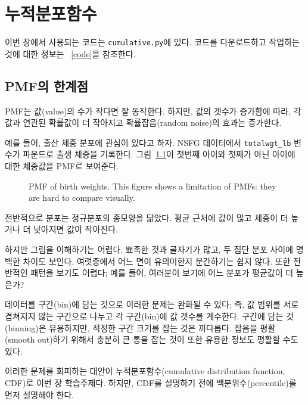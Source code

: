 
\chapter{누적분포함수}
\label{cumulative}

이번 장에서 사용되는 코드는 {\tt cumulative.py}에 있다.
코드를 다운로드하고 작업하는 것에 대한 정보는 ~\ref{code}을 참조한다.


\section{PMF의 한계점}

PMF는 값(value)의 수가 작다면 잘 동작한다. 하지만, 값의 갯수가 증가함에 따라,
각 값과 연관된 확률값이 더 작아지고 확률잡음(random noise)의 효과는 증가한다.

예를 들어, 출산 체중 분포에 관심이 있다고 하자. NSFG 데이터에서 
\verb"totalwgt_lb" 변수가 파운드로 출생 체중을 기록한다.
그림~\ref{nsfg_birthwgt_pmf}이 첫번째 아이와 첫째가 아닌 아이에 대한 체중값을 
PMF로 보여준다.

\begin{figure}
\caption{PMF of birth weights.  This figure shows a limitation
of PMFs: they are hard to compare visually.}
\label{nsfg_birthwgt_pmf}
\end{figure}

전반적으로 분포는 정규분포의 종모양을 닮았다.
평균 근처에 값이 많고 체중이 더 높거나 더 낮아지면 값이 작아진다.

하지만 그림을 이해하기는 어렵다. 뾰족한 것과 골자기가 많고, 두 집단 분포 사이에
명백한 차이도 보인다. 여럿중에서 어느 면이 유의미한지 분간하기는 쉽지 않다.
또한 전반적인 패턴을 보기도 어렵다; 예를 들어, 여러분이 보기에 어느 분포가 평균값이 더 높은가?

데이터를 구간(bin)에 담는 것으로 이러한 문제는 완화될 수 있다; 즉, 값 범위를 서로 겹쳐지지 않는 구간으로 
나누고 각 구간(bin)에 값 갯수를 계수한다. 구간에 담는 것(binning)은 유용하지만,
적정한 구간 크기를 잡는 것은 까다롭다. 잡음을 평활(smooth out)하기 위해서 충분히 큰 통을 잡는 것이 
또한 유용한 정보도 평활할 수도 있다.

이러한 문제를 회피하는 대안이 누적분포함수(cumulative
distribution function, CDF)로 이번 장 학습주제다. 하지만, CDF를 설명하기 전에 백분위수(percentile)를 먼저 설명해야 한다.



